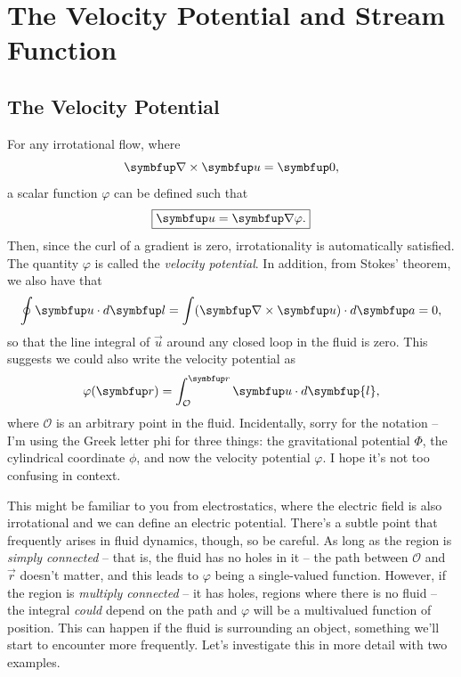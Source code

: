 \section{The Velocity Potential and Stream Function}

\subsection{The Velocity Potential}

For any irrotational flow, where
\[
\curl \uu = \vec{0},
\]
a scalar function $\varphi$ can be defined such that
\begin{equation}
\label{eq_vel_pot}
\boxed{
\uu = \grad \varphi.
}
\end{equation}
Then, since the curl of a gradient is zero, irrotationality is automatically satisfied. The quantity $\varphi$ is called the \emph{velocity potential}.  In addition, from Stokes' theorem, we also have that
\[
\oint \uu \cdot d\vec{l} = \int (\curl \uu) \cdot d\vec{a} = 0,
\]
so that the line integral of $\vec{u}$ around any closed loop in the fluid is zero.  This suggests we could also write the velocity potential as
\begin{equation}
\label{eq_vel_pot2}
\varphi(\vec{r}) = \int_{\mathcal{O}}^{\vec{r}} \uu \cdot d\symbfup{l},
\end{equation}
where $\mathcal{O}$ is an arbitrary point in the fluid.  Incidentally, sorry for the notation -- I'm using the Greek letter phi for three things:  the gravitational potential $\Phi$, the cylindrical coordinate $\phi$, and now the velocity potential $\varphi$.  I hope it's not too confusing in context.

This might be familiar to you from electrostatics, where the electric field is also irrotational and we can define an electric potential.  There's a subtle point that frequently arises in fluid dynamics, though, so be careful.  As long as the region is \emph{simply connected} -- that is, the fluid has no holes in it -- the path between $\mathcal{O}$ and $\vec{r}$ doesn't matter, and this leads to $\varphi$ being a single-valued function.  However, if the region is \emph{multiply connected} -- it has holes, regions where there is no fluid -- the integral \emph{could} depend on the path and $\varphi$ will be a multivalued function of position.  This can happen if the fluid is surrounding an object, something we'll start to encounter more frequently.  Let's investigate this in more detail with two examples.

